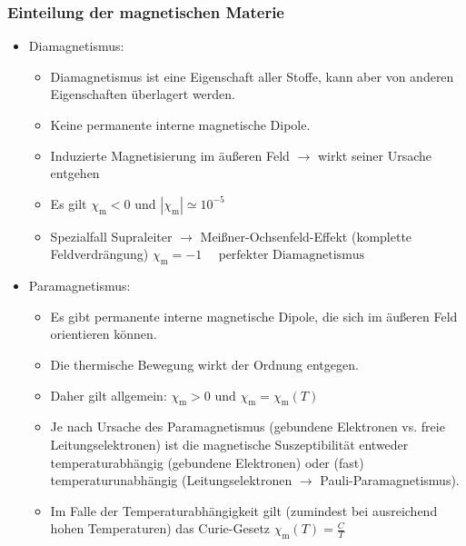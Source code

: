\begin{frame}
  \frametitle{Einteilung der magnetischen Materie}
  \begin{itemize}[<+->]
  \item \alert{Diamagnetismus:}
    \begin{itemize}[<+->]
    \item Diamagnetismus ist eine Eigenschaft \alert{aller Stoffe}, kann aber von anderen Eigenschaften überlagert werden.
    \item Keine permanente interne magnetische Dipole.
    \item Induzierte Magnetisierung im äußeren Feld $\to$ wirkt seiner Ursache entgehen
    \item Es gilt $\chi_\mathrm{m} < 0$ und $|\chi_\mathrm{m}| \simeq 10^{-5}$
    \item Spezialfall \alert{Supraleiter} $\to$ Meißner-Ochsenfeld-Effekt (komplette Feldverdrängung)
      $\chi_\mathrm{m} = -1 \quad \text{ perfekter Diamagnetismus}$
      \end{itemize}
  \item \alert{Paramagnetismus:}
    \begin{itemize}[<+->]
    \item Es gibt \alert{permanente interne magnetische Dipole}, die sich im äußeren Feld orientieren können.
    \item Die thermische Bewegung wirkt der Ordnung entgegen.
    \item Daher gilt allgemein: $\chi_\mathrm{m} > 0 \text{ und } \chi_\mathrm{m} = \chi_\mathrm{m}(T)$
    \item Je nach Ursache des Paramagnetismus (gebundene Elektronen vs. freie Leitungselektronen) ist die magnetische Suszeptibilität entweder \alert{temperaturabhängig} (gebundene Elektronen) oder (fast) \alert{temperaturunabhängig} (Leitungselektronen $\to$ \alert{Pauli-Paramagnetismus}).
    \item Im Falle der Temperaturabhängigkeit gilt (zumindest bei ausreichend hohen Temperaturen) das \alert{Curie-Gesetz} $\chi_\mathrm{m}(T) = \frac{C}{T}$
      \end{itemize}
\end{itemize}
\end{frame}


